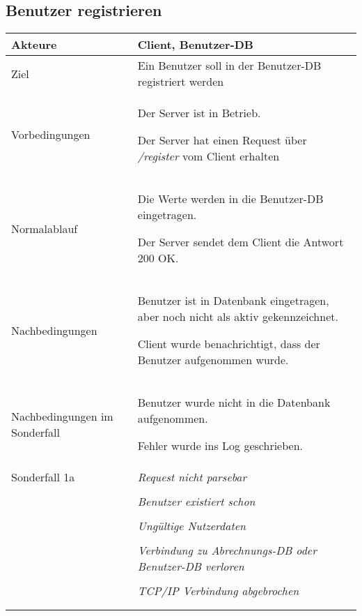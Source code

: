 \documentclass[a4paper,10pt,titlepage,parskip=true]{article}
\makeatletter
\newcommand\novspace{\@minipagetrue}
\newenvironment{owncompactitem}{%
\compactitem
}{%
\@finalstrut\@arstrutbox
\@nameuse{endcompactitem}%
\aftergroup\let\aftergroup\@finalstrut\aftergroup\@gobble
}
\newenvironment{owncompactenum}{%
\compactenum
}{%
\@finalstrut\@arstrutbox
\@nameuse{endcompactenum}%
\aftergroup\let\aftergroup\@finalstrut\aftergroup\@gobble
}
\newcommand{\usecase}[7]
{\subsection{#1}
\setlength{\extrarowheight}{2pt}
\begin{tabular}{|p{0.2\textwidth}|p{0.9\textwidth}|}
\hline
  Akteure & #2\\\hline
  Ziel & #3\\\hline
  Vorbedingungen & \novspace
  	\begin{owncompactitem}[-] #4 \end{owncompactitem} \\\hline
  Normalablauf & \vspace{-7pt}
  	\begin{owncompactenum}[1.] #6 \end{owncompactenum} \\\hline
  Nachbedingungen & \novspace
  	\begin{owncompactitem}[-] #5 \end{owncompactitem} \\\hline
  #7
\end{tabular}
}
\newcommand{\sonderfall}[4][\empty]
{
Sonderfall #2 & \vspace{-10pt}
	\textit{#3}
	\begin{owncompactenum}[{#2}.1] {#4} \end{owncompactenum}
  	\ifthenelse{\equal{#1}{\empty}}
    	{\\\hline} %
    	{\ensuremath{\rightarrow} #1 \\ [+1pt] \hline} %

}
\newcommand{\sondernachbedingung}[1]
{
Nachbedingungen im Sonderfall& \novspace
	\begin{owncompactitem}[-]
		#1
	\end{owncompactitem} \\\hline
}
\makeatother
\begin{document}
\usecase{Benutzer registrieren}{Client, Benutzer-DB}%
{Ein Benutzer soll in der Benutzer-DB registriert werden}%
{%
  \item Der Server ist in Betrieb.
  \item Der Server hat einen Request über \textit{/register} vom Client erhalten
}
{%
  \item Benutzer ist in Datenbank eingetragen, aber noch nicht als aktiv gekennzeichnet.
  \item Client wurde benachrichtigt, dass der Benutzer aufgenommen wurde.
}
{%
  \item  Die Werte werden in die Benutzer-DB eingetragen.
  \item  Der Server sendet dem Client die Antwort 200 OK.
}
{%
  \sondernachbedingung{
	\item Benutzer wurde nicht in die Datenbank aufgenommen.
	\item Fehler wurde ins Log geschrieben.
	}
  
	\sonderfall[Weiter mit normalem Betrieb]{1a}
    {Request nicht parsebar}
    {
    \item Fehler wird ins Log geschrieben
  	\item Der Client erhält einen EBADJSON Fehler mit HTTP-Status 400 Bad Request
    }  
  
  \sonderfall[Weiter mit normalen Betrieb]{1b}%
	  {Benutzer existiert schon}%
	  {
	  \item Der Fehler wird ins Log geschrieben.
	  \item Dem Client erhält einen EREGISTERED Fehler HTTP-Status 403 forbidden.
	  } 

  \sonderfall[Fehler]{1c}%
	  {Ungültige Nutzerdaten}%
	  {
	  \item Der Fehler wird ins Log geschrieben.
	  \item Dem Client wird ein entsprechender Fehler übermittelt.
	  }

  \sonderfall[Der Server nimmt keine weiteren Anfragen an bis Verbindung zur Datenbank wieder hergestellt.]{*}%
	{Verbindung zu Abrechnungs-DB oder Benutzer-DB verloren}%
  	{
	\item Der Fehler wird ins Log geschrieben
	\item Der Client erhält einen EDATABASE Fehler mit HTTP-Status 503 Service Unavailable
  	}

\sonderfall[Weiter mit normalem Betrieb]{**}%
	{TCP/IP Verbindung abgebrochen}%
	{
	\item Fehlermeldung wird ins Log geschrieben
	}
}
\end{document}

